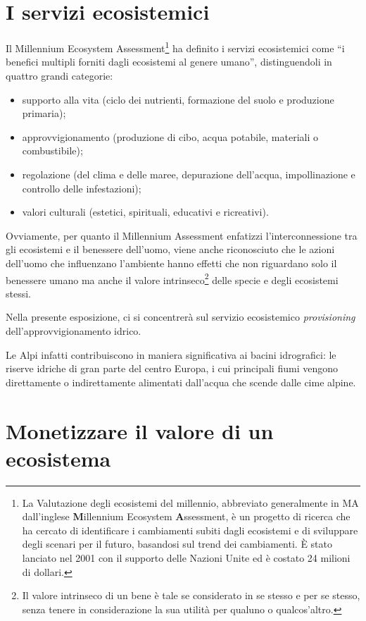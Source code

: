 \documentclass[14pt,a4paper]{article}
\begin{document}
	\section{I servizi ecosistemici}
		Il Millennium Ecosystem Assessment\footnote{La Valutazione degli ecosistemi del millennio, abbreviato generalmente in MA dall'inglese \textbf{M}illennium Ecosystem \textbf{A}ssessment, è un progetto di ricerca che ha cercato di identificare i cambiamenti subiti dagli ecosistemi e di sviluppare degli scenari per il futuro, basandosi sul trend dei cambiamenti. È stato lanciato nel 2001 con il supporto delle Nazioni Unite ed è costato 24 milioni di dollari.} \cite{MEA_EcosystemsAndHumanWellBeing:Synthesis} ha definito i servizi ecosistemici come ``i benefici multipli forniti dagli ecosistemi al genere umano'', distinguendoli in quattro grandi categorie:
		\begin{itemize}
			\item supporto alla vita (ciclo dei nutrienti, formazione del suolo e produzione primaria);
			\item approvvigionamento (produzione di cibo, acqua potabile, materiali o combustibile);
			\item regolazione (del clima e delle maree, depurazione dell'acqua, impollinazione e controllo delle infestazioni);
			\item valori culturali (estetici, spirituali, educativi e ricreativi).
		\end{itemize}
		
		
		Ovviamente, per quanto il Millennium Assessment enfatizzi l'interconnessione tra gli ecosistemi e il benessere dell'uomo, viene anche riconosciuto che le azioni dell'uomo che influenzano l'ambiente hanno effetti che non riguardano solo il benessere umano ma anche il valore intrinseco\footnote{ Il valore intrinseco di un bene è tale se considerato in se stesso e per se stesso, senza tenere in considerazione la sua utilità per qualuno o qualcos'altro.	} delle specie e degli ecosistemi stessi.
		
		Nella presente esposizione, ci si concentrerà sul servizio ecosistemico \textit{provisioning} dell'approvvigionamento idrico. 
		
		Le Alpi infatti contribuiscono in maniera significativa ai bacini idrografici: le riserve idriche di gran parte del centro Europa, i cui principali fiumi vengono direttamente o indirettamente alimentati dall'acqua che scende dalle cime alpine. 
	
	\section{Monetizzare il valore di un ecosistema}
\end{document}
